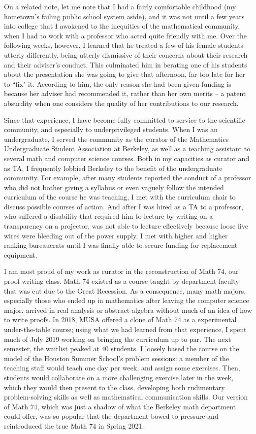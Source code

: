 \documentclass[12pt]{article}
\begin{document}
On a related note, let me note that I had a fairly comfortable childhood (my hometown's failing public school system aside), and it was not until a few years into college that I awokened to the inequities of the mathematical community, when I had to work with a professor who acted quite friendly with me.
Over the following weeks, however, I learned that he treated a few of his female students utterly differently, being utterly dismissive of their concerns about their research and their adviser's conduct.
This culminated him in berating one of his students about the presentation she was going to give that afternoon, far too late for her to ``fix" it.
According to him, the only reason she had been given funding is because her adviser had recommended it, rather than her own merits -- a patent absurdity when one considers the quality of her contributions to our research.

Since that experience, I have become fully committed to service to the scientific community, and especially to underprivileged students.
When I was an undergraduate, I served the community as the curator of the Mathematics Undergraduate Student Association at Berkeley, as well as a teaching assistant to several math and computer science courses.
Both in my capacities as curator and as TA, I frequently lobbied Berkeley to the benefit of the undergraduate community.
For example, after many students reported the conduct of a professor who did not bother giving a syllabus or even vaguely follow the intended curriculum of the course he was teaching, I met with the curriculum chair to discuss possible courses of action.
And after I was hired as a TA to a professor, who suffered a disability that required him to lecture by writing on a transparency on a projector, was not able to lecture effectively because loose live wires were bleeding out of the power supply, I met with higher and higher ranking bureaucrats until I was finally able to secure funding for replacement equipment.

I am most proud of my work as curator in the reconstruction of Math 74, our proof-writing class.
Math 74 existed as a course taught by department faculty that was cut due to the Great Recession.
As a consequence, many math majors, especially those who ended up in mathematics after leaving the computer science major, arrived in real analysis or abstract algebra without much of an idea of how to write proofs.
In 2018, MUSA offered a clone of Math 74 as a experimental under-the-table course; using what we had learned from that experience, I spent much of July 2019 working on bringing the curriculum up to par.
The next semester, the waitlist peaked at 40 students.
I loosely based the course on the model of the Houston Summer School's problem sessions: a member of the teaching staff would teach one day per week, and assign some exercises.
Then, students would collaborate on a more challenging exercise later in the week, which they would then present to the class, developing both rudimentary problem-solving skills as well as mathematical communication skills.
Our version of Math 74, which was just a shadow of what the Berkeley math department could offer, was so popular that the department bowed to pressure and reintroduced the true Math 74 in Spring 2021.
\end{document}
